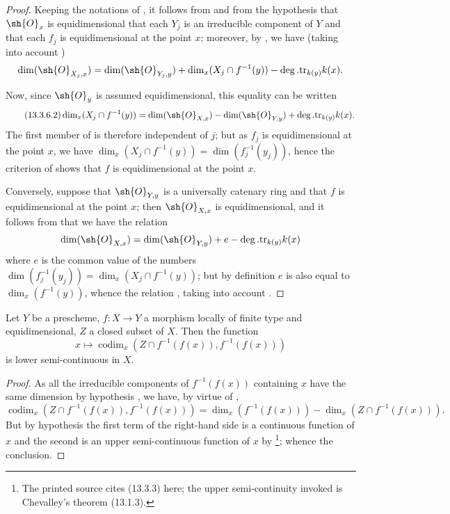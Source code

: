 \begin{proof}
Keeping the notations of , it follows from  and from the hypothesis that $\sh{O}_x$ is equidimensional that each $Y_j$ is an irreducible component of $Y$ and that each $f_j$ is equidimensional at the point $x$; moreover, by , we have (taking into account )
\[
  \dim(\sh{O}_{X_j,x})=\dim(\sh{O}_{Y_j,y})+\dim_x(X_j\cap f^{-1}(y))-\deg.\mathrm{tr}_{k(y)}k(x).
\]


Now, since $\sh{O}_y$ is assumed equidimensional, this equality can be written
\[
\tag{13.3.6.2}
\label{IV.13.3.6.2}
  \dim_x(X_j\cap f^{-1}(y))=\dim(\sh{O}_{X,x})-\dim(\sh{O}_{Y,y})+\deg.\mathrm{tr}_{k(y)}k(x).
\]
The first member of  is therefore independent of $j$; but as $f_j$ is equidimensional at the point $x$, we have $\dim_x(X_j\cap f^{-1}(y))=\dim(f_j^{-1}(y_j))$, hence the criterion of  shows that $f$ is equidimensional at the point $x$.

Conversely, suppose that $\sh{O}_{Y,y}$ is a universally catenary ring and that $f$ is equidimensional at the point $x$; then  $\sh{O}_{X,x}$ is equidimensional, and it follows from  that we have the relation
\[
  \dim(\sh{O}_{X,x})=\dim(\sh{O}_{Y,y})+e-\deg.\mathrm{tr}_{k(y)}k(x)
\]
where $e$ is the common value of the numbers $\dim(f_j^{-1}(y_j))=\dim_x(X_j\cap f^{-1}(y))$; but by definition $e$ is also equal to $\dim_x(f^{-1}(y))$, whence the relation , taking into account .
\end{proof}

\begin{proposition}[13.3.7]
\label{IV.13.3.7}
Let $Y$ be a prescheme, $f:X\to Y$ a morphism locally of finite type and equidimensional, $Z$ a closed subset of $X$.
Then the function
\[
\label{IV.13.3.7.1}
\tag{13.3.7.1}
  x\mapsto\operatorname{codim}_x(Z\cap f^{-1}(f(x)),f^{-1}(f(x)))
\]
is lower semi-continuous in $X$.
\end{proposition}

\begin{proof}
As all the irreducible components of $f^{-1}(f(x))$ containing $x$ have the same dimension by hypothesis , we have, by virtue of ,
\[
  \operatorname{codim}_x(Z\cap f^{-1}(f(x)),f^{-1}(f(x)))=\dim_x(f^{-1}(f(x)))-\dim_x(Z\cap f^{-1}(f(x))).
\]
But by hypothesis the first term of the right-hand side is a continuous function of $x$  and the second is an upper semi-continuous function of $x$ by \footnote{The printed source cites (13.3.3) here; the upper semi-continuity invoked is Chevalley's theorem (13.1.3).}; whence the conclusion.
\end{proof}

